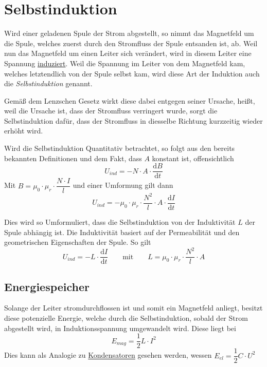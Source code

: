\documentclass{article}
\begin{document}
 
 
\newcommand{\derive}[2]{\frac{\mathrm{d}#1}{\mathrm{d}#2}} 
 
\section{Selbstinduktion} 
Wird einer geladenen Spule der Strom abgestellt, so nimmt das Magnetfeld um die Spule, welches zuerst durch den Stromfluss der Spule entsanden ist, ab. Weil nun das Magnetfeld um einen Leiter sich verändert, wird in diesem Leiter eine Spannung \hyperref[Induktion]{induziert}. Weil die Spannung im Leiter von dem Magnetfeld kam, welches letztendlich von der Spule selbst kam, wird diese Art der Induktion auch die \emph{Selbstinduktion} genannt.
 
Gemäß dem Lenzschen Gesetz wirkt diese dabei entgegen seiner Ursache, heißt, weil die Ursache ist, dass der Stromfluss verringert wurde, sorgt die Selbstinduktion dafür, dass der Stromfluss in diesselbe Richtung kurzzeitig wieder erhöht wird.
 
Wird die Selbstinduktion Quantitativ betrachtet, so folgt aus den bereits bekannten Definitionen und dem Fakt, dass $A$ konstant ist, offensichtlich
\[
 U_{ind} = -N \cdot A \cdot \derive{B}{t}
\] 
Mit $B = \mu_0 \cdot \mu_r \cdot \dfrac{N \cdot I}{l}$ und einer Umformung gilt dann
\[
 U_{ind} = -\mu_0 \cdot \mu_r \cdot \frac{N^2}{l} \cdot A \cdot \derive{I}{t} 
\]
 
Dies wird so Umformuliert, dass die Selbstinduktion von der Induktivität $L$ der Spule abhängig ist. Die Induktivität basiert auf der Permeabilität und den geometrischen Eigenschaften der Spule. So gilt
\[
 U_{ind} = -L \cdot \derive{I}{t}
 \qquad \text{mit} \qquad
 L = \mu_0 \cdot \mu_r \cdot \frac{N^2}{l} \cdot A  
\]
 
\subsection{Energiespeicher}
Solange der Leiter stromdurchflossen ist und somit ein Magnetfeld anliegt, besitzt diese potenzielle Energie, welche durch die Selbstinduktion, sobald der Strom abgestellt wird, in Induktionsspannung umgewandelt wird. Diese liegt bei
\[
 E_{mag} = \frac{1}{2} L \cdot I^2 
\]
Dies kann als Analogie zu \hyperref[Kondensator]{Kondensatoren} gesehen werden, wessen $E_{el} = \dfrac{1}{2} C \cdot U^2$ 
\end{document}
